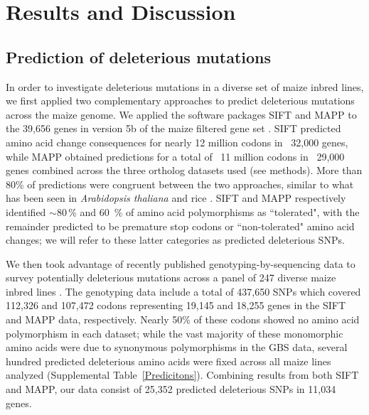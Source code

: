 \documentclass[12pt]{article}
\begin{document}
\section*{Results and Discussion}

\subsection*{Prediction of deleterious mutations}

In order to investigate deleterious mutations in a diverse set of maize inbred lines, we first applied two complementary approaches to predict deleterious mutations across the maize genome.  We applied the software packages SIFT \citep{Ng2003, Ng2006} and MAPP \citep{Stone2005} to the 39,656 genes in version 5b of the maize filtered gene set  \citep[\url{http://www.maizesequence.org};][]{Schnable2009}. SIFT predicted amino acid change consequences for nearly 12 million codons in ~32,000 genes, while MAPP obtained predictions for a total of ~11 million codons in ~29,000 genes combined across the three ortholog datasets used (see methods). More than 80\% of predictions were congruent between the two approaches, similar to what has been seen in \emph{Arabidopsis thaliana} and rice \citep{Gunther2010}. SIFT and MAPP respectively identified $\sim$80\,\% and 60\, \% of amino acid polymorphisms as ``tolerated", with the remainder predicted to be premature stop codons or ``non-tolerated" amino acid changes; we will refer to these latter categories as predicted deleterious SNPs.

We then took advantage of recently published genotyping-by-sequencing \citep[GBS; ][]{Elshire2011} data to survey potentially deleterious mutations across a panel of 247 diverse maize inbred lines \citep{Larsson2013, Romay2013}. The genotyping data include a total of  437,650 SNPs which covered 112,326 and 107,472 codons representing 19,145 and 18,255 genes in the SIFT and MAPP data, respectively. Nearly 50\% of these codons showed no amino acid polymorphism in each dataset; while the vast majority of these monomorphic amino acids were due to synonymous polymorphisms in the GBS data, several hundred predicted deleterious amino acids were fixed across all maize lines analyzed (Supplemental Table~\ref{Predicitons}). Combining results from both SIFT and MAPP, our data consist of 25,352 predicted deleterious SNPs in 11,034 genes.
\end{document}
